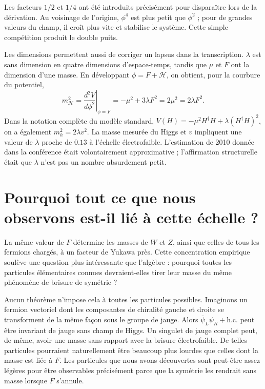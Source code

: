 Les facteurs \(1/2\) et \(1/4\) ont été introduits précisément pour disparaître lors de la dérivation. Au voisinage de l’origine, \(\phi^4\) est plus petit que \(\phi^2\) ; pour de grandes valeurs du champ, il croît plus vite et stabilise le système. Cette simple compétition produit le double puits.

Les dimensions permettent aussi de corriger un lapsus dans la transcription. \(\lambda\) est sans dimension en quatre dimensions d’espace-temps, tandis que \(\mu\) et \(F\) ont la dimension d’une masse. En développant \(\phi=F+\mathcal H\), on obtient, pour la courbure du potentiel, \begin{equation}
  m_{\mathcal H}^2
  =
  \left.\frac{d^2V}{d\phi^2}\right|_{\phi=F}
  =
  -\mu^2+3\lambda F^2
  =
  2\mu^2
  =
  2\lambda F^2.
  \label{eq:l10-higgs-curvature}
\end{equation}Dans la notation complète du modèle standard, \(V(H)=-\mu^2H^\dagger H+\lambda(H^\dagger H)^2\), on a également \(m_h^2=2\lambda v^2\). La masse mesurée du Higgs et \(v\) impliquent une valeur de \(\lambda\) proche de \(0.13\) à l’échelle électrofaible. L’estimation de 2010 donnée dans la conférence était volontairement approximative ; l’affirmation structurelle était que \(\lambda\) n’est pas un nombre absurdement petit.

\section{Pourquoi tout ce que nous observons est-il lié à cette échelle ?}

La même valeur de \(F\) détermine les masses de \(W\) et \(Z\), ainsi que celles de tous les fermions chargés, à un facteur de Yukawa près. Cette concentration empirique soulève une question plus intéressante que l’algèbre : pourquoi toutes les particules élémentaires connues devraient-elles tirer leur masse du même phénomène de brisure de symétrie ?

Aucun théorème n’impose cela à toutes les particules possibles. Imaginons un fermion vectoriel dont les composantes de chiralité gauche et droite se transforment de la même façon sous le groupe de jauge. Alors \(\bar\psi_L\psi_R+\mathrm{h.c.}\) peut être invariant de jauge sans champ de Higgs. Un singulet de jauge complet peut, de même, avoir une masse sans rapport avec la brisure électrofaible. De telles particules pourraient naturellement être beaucoup plus lourdes que celles dont la masse est liée à \(F\). Les particules que nous avons découvertes sont peut-être assez légères pour être observables précisément parce que la symétrie les rendrait sans masse lorsque \(F\) s’annule.

